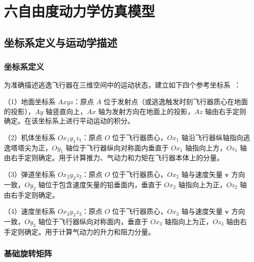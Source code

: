 ﻿%

\chapter{六自由度动力学仿真模型}

\section{坐标系定义与运动学描述}

\subsection{坐标系定义}

为准确描述逃逸飞行器在三维空间中的运动状态，建立如下四个参考坐标系~\cite{刘思奇2021,张希彬2019,张远2022,龚梦琳2025}：

（1）地面坐标系 $Axyz$：原点 $A$ 位于发射点（或逃逸触发时刻飞行器质心在地面的投影），$Ay$ 轴竖直向上，$Ax$ 轴为发射方向在地面上的投影，$Az$ 轴由右手定则确定。在该坐标系上进行平动运动的积分。

（2）机体坐标系 $Ox_1y_1z_1$：原点 $O$ 位于飞行器质心，$Ox_1$ 轴沿飞行器纵轴指向逃逸塔塔尖为正，$Oy_1$ 轴位于飞行器纵向对称面内垂直于 $Ox_1$ 轴指向上方，$Oz_1$ 轴由右手定则确定。用于计算推力、气动力和力矩在飞行器本体上的分量。

（3）弹道坐标系 $Ox_2y_2z_2$：原点 $O$ 位于飞行器质心，$Ox_2$ 轴与速度矢量 $\mathbf v$ 方向一致，$Oy_2$ 轴位于包含速度矢量的铅垂面内，垂直于 $Ox_2$ 轴指向上为正，$Oz_2$ 轴由右手定则确定。

（4）速度坐标系 $Ox_3y_3z_3$：原点 $O$ 位于飞行器质心，$Ox_3$ 轴与速度矢量 $\mathbf v$ 方向一致，$Oy_3$ 轴位于飞行器纵向对称面内，垂直于 $Ox_3$ 轴指向上为正，$Oz_3$ 轴由右手定则确定。用于计算气动力的升力和阻力分量。

\subsection{基础旋转矩阵}


